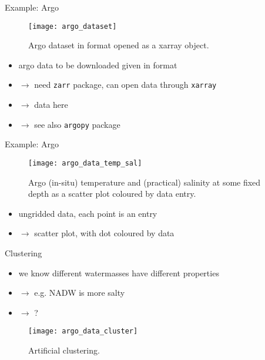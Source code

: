 \documentclass[xcolor=x11names,compress]{beamer}
\renewcommand{\(}{\begin{columns}}
\renewcommand{\)}{\end{columns}}
\newcommand{\<}[1]{\begin{column}{#1}}
\renewcommand{\>}{\end{column}}
\begin{document}

\begin{frame}{Example: Argo}

\begin{figure}
  \texttt{[image: argo\_dataset]}
  \caption{Argo dataset in  format opened as a xarray object.}
\end{figure}

\begin{itemize}
  \item argo data to be downloaded given in  format
  \item[] $\to$ need \texttt{zarr} package, can open data through
  \texttt{xarray}
  \item[] $\to$  data here
  \item[] $\to$ see also \texttt{argopy} package
\end{itemize}

\end{frame}


\begin{frame}{Example: Argo}

\begin{figure}
  \texttt{[image: argo\_data\_temp\_sal]}
  \caption{Argo (in-situ) temperature and (practical) salinity at some fixed
  depth as a scatter plot coloured by data entry.}
\end{figure}

\begin{itemize}
  \item ungridded data, each point is an entry
  \item[] $\to$ scatter plot, with dot coloured by data
\end{itemize}

\end{frame}


\begin{frame}{Clustering}

\begin{itemize}
  \item we know different watermasses have different properties
  \item[] $\to$ e.g. NADW is more salty
  \item[] $\to$ ?
\end{itemize}

\begin{figure}
  \texttt{[image: argo\_data\_cluster]}
  \caption{Artificial clustering.}
\end{figure}

\end{frame}
\end{document}
